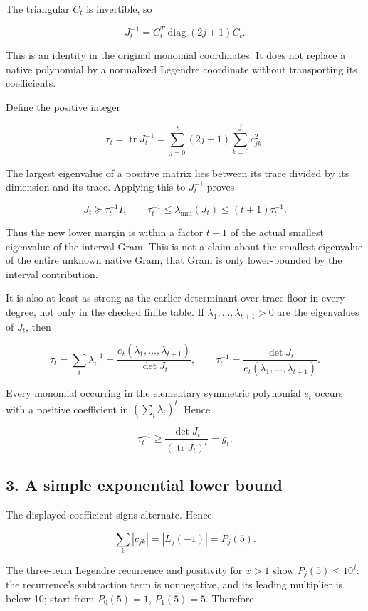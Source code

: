 The triangular \(C_t\) is invertible, so

\[
 \boxed{J_t^{-1}=C_t^T\operatorname{diag}(2j+1)C_t.}
\]

This is an identity in the original monomial coordinates. It does not
replace a native polynomial by a normalized Legendre coordinate without
transporting its coefficients.

Define the positive integer

\[
 \tau_t=\operatorname{tr}J_t^{-1}
 =\sum_{j=0}^t(2j+1)\sum_{k=0}^j c_{jk}^2.
\]

The largest eigenvalue of a positive matrix lies between its trace
divided by its dimension and its trace. Applying this to \(J_t^{-1}\)
proves

\[
 \boxed{J_t\succeq\tau_t^{-1}I,\qquad
 \tau_t^{-1}\le\lambda_{\min}(J_t)\le(t+1)\tau_t^{-1}.}
\]

Thus the new lower margin is within a factor \(t+1\) of the actual
smallest eigenvalue of the interval Gram. This is not a claim about the
smallest eigenvalue of the entire unknown native Gram; that Gram is only
lower-bounded by the interval contribution.

It is also at least as strong as the earlier determinant-over-trace
floor in every degree, not only in the checked finite table. If
\(\lambda_1,\ldots,\lambda_{t+1}>0\) are the eigenvalues of \(J_t\),
then

\[
 \tau_t=\sum_i\lambda_i^{-1}
 =\frac{e_t(\lambda_1,\ldots,\lambda_{t+1})}{\det J_t},
 \qquad
 \tau_t^{-1}=\frac{\det J_t}{e_t(\lambda_1,\ldots,\lambda_{t+1})}.
\]

Every monomial occurring in the elementary symmetric polynomial \(e_t\)
occurs with a positive coefficient in \((\sum_i\lambda_i)^t\). Hence

\[
 \boxed{\tau_t^{-1}\ge
 \frac{\det J_t}{(\operatorname{tr}J_t)^t}=g_t.}
\]

\subsection{3. A simple exponential lower
bound}\label{a-simple-exponential-lower-bound}

The displayed coefficient signs alternate. Hence

\[
 \sum_k|c_{jk}|=|L_j(-1)|=P_j(5).
\]

The three-term Legendre recurrence and positivity for \(x>1\) show
\(P_j(5)\le10^j\): the recurrence's subtraction term is nonnegative, and
its leading multiplier is below 10; start from \(P_0(5)=1\),
\(P_1(5)=5\). Therefore

